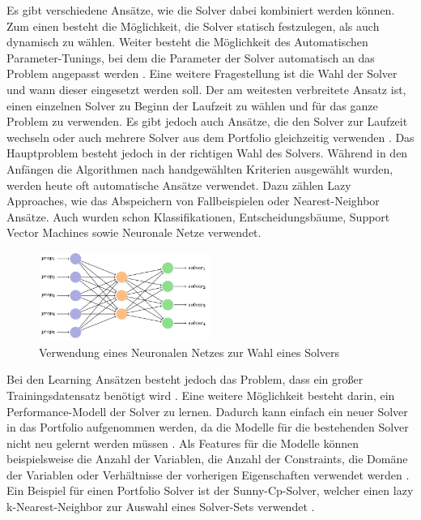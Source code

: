 Es gibt verschiedene Ansätze, wie die Solver dabei kombiniert werden können. Zum
einen besteht die Möglichkeit, die Solver statisch festzulegen, als auch
dynamisch zu wählen. Weiter besteht die Möglichkeit des Automatischen
Parameter-Tunings, bei dem die Parameter der Solver automatisch an das Problem
angepasst werden \cite[8-11]{kotth12jo}. Eine weitere Fragestellung ist die Wahl
der Solver und wann dieser eingesetzt werden soll. Der am weitesten verbreitete
Ansatz ist, einen einzelnen Solver zu Beginn der Laufzeit zu wählen und für das
ganze Problem zu verwenden. Es gibt jedoch auch Ansätze, die den Solver zur
Laufzeit wechseln oder auch mehrere Solver aus dem Portfolio gleichzeitig
verwenden \cite[11-14]{kotth12jo}. Das Hauptproblem besteht jedoch in der
richtigen Wahl des Solvers. Während in den Anfängen die Algorithmen nach
handgewählten Kriterien ausgewählt wurden, werden heute oft automatische Ansätze
verwendet. Dazu zählen Lazy Approaches, wie das Abspeichern von Fallbeispielen
oder Nearest-Neighbor Ansätze. Auch wurden schon Klassifikationen,
Entscheidungsbäume, Support Vector Machines sowie Neuronale Netze verwendet.

\begin{figure}[h]
    \centering
    \includegraphics[width=0.5\textwidth]{figures/Neuronal Nework to choose Solver [popes22jo].PNG}
    \caption{Verwendung eines Neuronalen Netzes zur Wahl eines Solvers
    \cite[105]{popes22jo}}
    \label{fig:NeuronalNework}
\end{figure}

Bei den Learning Ansätzen besteht jedoch das Problem, dass ein großer
Trainingsdatensatz benötigt wird \cite[15-16]{kotth12jo}. Eine weitere
Möglichkeit besteht darin, ein Performance-Modell der Solver zu lernen. Dadurch
kann einfach ein neuer Solver in das Portfolio aufgenommen werden, da die
Modelle für die bestehenden Solver nicht neu gelernt werden müssen
\cite[18]{kotth12jo}. Als Features für die Modelle können beispielsweise die
Anzahl der Variablen, die Anzahl der Constraints, die Domäne der Variablen oder
Verhältnisse der vorherigen Eigenschaften verwendet werden \cite[22]{kotth12jo}.
Ein Beispiel für einen Portfolio Solver ist der Sunny-Cp-Solver, welcher einen
lazy k-Nearest-Neighbor zur Auswahl eines Solver-Sets verwendet
\cite[4]{amadi15jo}.


